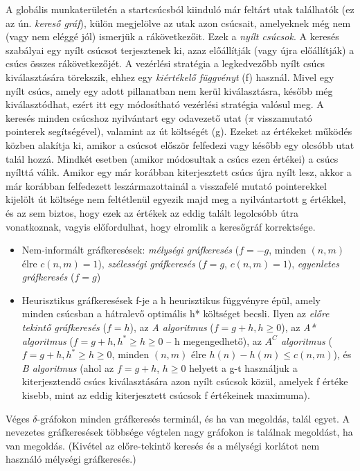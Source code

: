 \documentclass[margin=0px]{article}
\begin{document}
A globális munkaterületén a startcsúcsból kiinduló már feltárt utak találhatók (ez az ún. \textit{kereső gráf}), külön megjelölve az utak azon csúcsait, amelyeknek még nem (vagy nem eléggé jól) ismerjük a rákövetkezőit. Ezek a \textit{nyílt csúcsok}. A keresés szabályai egy nyílt csúcsot terjesztenek ki, azaz előállítják (vagy újra előállítják) a csúcs összes rákövetkezőjét. A vezérlési stratégia a legkedvezőbb nyílt csúcs kiválasztására törekszik, ehhez egy \textit{kiértékelő függvényt} (f) használ. Mivel egy nyílt csúcs, amely egy adott pillanatban nem kerül kiválasztásra, később még kiválasztódhat, ezért itt egy módosítható vezérlési stratégia valósul meg.
A keresés minden csúcshoz nyilvántart egy odavezető utat (\textbf{$\pi$} visszamutató pointerek segítségével), valamint az út költségét (g). Ezeket az értékeket működés közben alakítja ki, amikor a csúcsot először felfedezi vagy később egy olcsóbb utat talál hozzá. Mindkét esetben (amikor módosultak a csúcs ezen értékei) a csúcs nyílttá válik. Amikor egy már korábban kiterjesztett csúcs újra nyílt lesz, akkor a már korábban felfedezett leszármazottainál a visszafelé mutató pointerekkel kijelölt út költsége nem feltétlenül egyezik majd meg a nyilvántartott g értékkel, és az sem biztos, hogy ezek az értékek az eddig talált legolcsóbb útra vonatkoznak, vagyis előfordulhat, hogy elromlik a keresőgráf korrektsége.
\begin{itemize}
    \item Nem-informált gráfkeresések: \textit{mélységi gráfkeresés} ($f = -g$, minden $(n,m)$ élre $c(n,m)=1$), \textit{szélességi gráfkeresés} ($f = g$, $c(n,m)=1$), \textit{egyenletes gráfkeresés} ($f = g$)
    \item Heurisztikus gráfkeresések f-je a h heurisztikus függvényre épül, amely minden csúcsban a hátralevő optimális h* költséget becsli. Ilyen az \textit{előre tekintő gráfkeresés} ($f = h$), az \textit{A algoritmus} ($f = g+h, h \geq 0$), az \textit{A* algoritmus} ($f = g+h, h^* \geq h \geq 0$ – h megengedhető), az \textit{$A^C$ algoritmus} ($f = g+h, h^* \geq h \geq 0$, minden $(n,m)$ élre $h(n)-h(m) \leq c(n,m)$), és \textit{B algoritmus} (ahol az $f= g+h$, $h \geq 0$ helyett a g-t használjuk a kiterjesztendő csúcs kiválasztására azon nyílt csúcsok közül, amelyek f értéke kisebb, mint az eddig kiterjesztett csúcsok f értékeinek maximuma).
\end{itemize}
Véges $\delta$-gráfokon minden gráfkeresés terminál, és ha van megoldás, talál egyet. A nevezetes gráfkeresések többsége végtelen nagy gráfokon is találnak megoldást, ha van megoldás. (Kivétel az előre-tekintő keresés és a mélységi korlátot nem használó mélységi gráfkeresés.)
\end{document}
